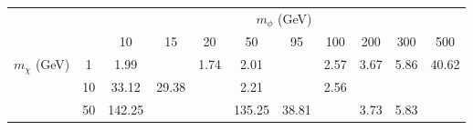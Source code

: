 \begin{tabular}{cc|ccccccccc} 
 & & \multicolumn{9}{c}{$m_\phi$ (GeV)} \\ 
& &10 & 15 & 20 & 50 & 95 & 100 & 200 & 300 & 500\\ 
 \hline \hline 
\multirow{3}{*}{$m_\chi$ (GeV)} & 1 & 1.99 &  & 1.74 & 2.01 &  & 2.57 & 3.67 & 5.86 & 40.62\\ 
 & 10 & 33.12 & 29.38 &  & 2.21 &  & 2.56 &  &  & \\ 
 & 50 & 142.25 &  &  & 135.25 & 38.81 &  & 3.73 & 5.83 & \\ 
 \end{tabular}